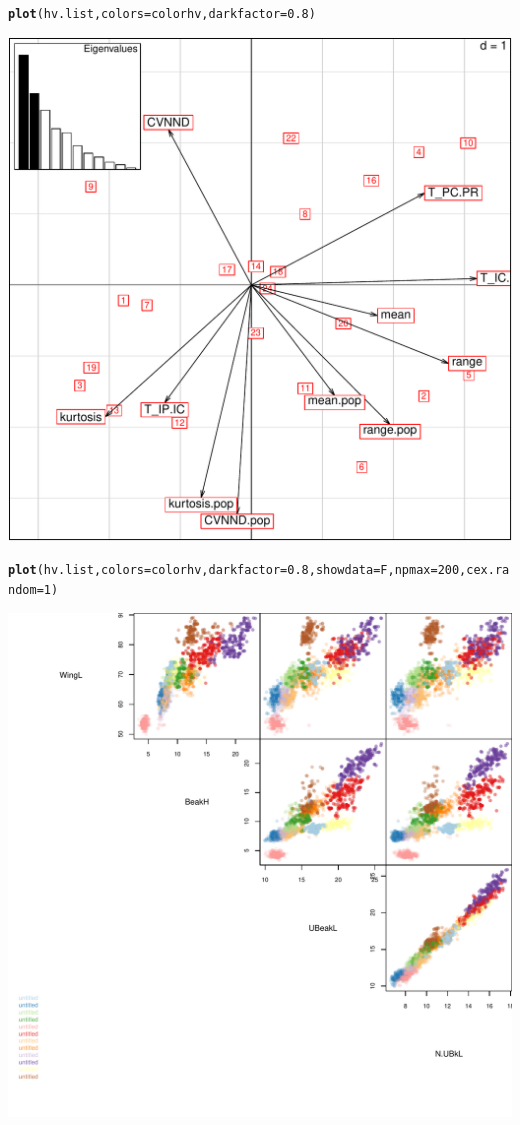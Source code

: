\documentclass[12pt]{article}\usepackage[]{graphicx}\usepackage[]{color}
\makeatletter
\def\maxwidth{ %
  \ifdim\Gin@nat@width>\linewidth
    \linewidth
  \else
    \Gin@nat@width
  \fi
}
\newcommand{\hlnum}[1]{\textcolor[rgb]{0.686,0.059,0.569}{#1}}%
\newcommand{\hlstd}[1]{\textcolor[rgb]{0.345,0.345,0.345}{#1}}%
\newcommand{\hlkwc}[1]{\textcolor[rgb]{0.333,0.667,0.333}{#1}}%
\newcommand{\hlkwd}[1]{\textcolor[rgb]{0.737,0.353,0.396}{\textbf{#1}}}%
\newenvironment{kframe}{%
 \def\at@end@of@kframe{}%
 \ifinner\ifhmode%
  \def\at@end@of@kframe{\end{minipage}}%
  \begin{minipage}{\columnwidth}%
 \fi\fi%
 \def\FrameCommand##1{\hskip\@totalleftmargin \hskip-\fboxsep
 \colorbox{shadecolor}{##1}\hskip-\fboxsep
     \hskip-\linewidth \hskip-\@totalleftmargin \hskip\columnwidth}%
 \MakeFramed {\advance\hsize-\width
   \@totalleftmargin\z@ \linewidth\hsize
   \@setminipage}}%
 {\par\unskip\endMakeFramed%
 \at@end@of@kframe}
\newenvironment{knitrout}{}{} %
\makeatother
\begin{document}
\begin{knitrout}
\begin{kframe}
\begin{alltt}
\hlkwd{plot}\hlstd{(hv.list,} \hlkwc{colors}\hlstd{=colorhv,} \hlkwc{darkfactor}\hlstd{=}\hlnum{0.8}\hlstd{)}
\end{alltt}
\end{kframe}
\includegraphics[width=\maxwidth]{figure/unnamed-chunk-471} 
\begin{kframe}\begin{alltt}
\hlkwd{plot}\hlstd{(hv.list,} \hlkwc{colors}\hlstd{=colorhv,} \hlkwc{darkfactor}\hlstd{=}\hlnum{0.8}\hlstd{,} \hlkwc{showdata}\hlstd{=F,} \hlkwc{npmax} \hlstd{=} \hlnum{200}\hlstd{,} \hlkwc{cex.random} \hlstd{=}\hlnum{1}\hlstd{)}
\end{alltt}
\end{kframe}
\includegraphics[width=\maxwidth]{figure/unnamed-chunk-472} 

\end{knitrout}
\end{document}
